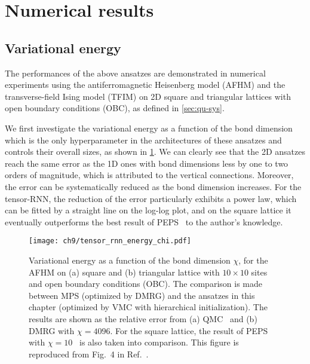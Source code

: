 \section{Numerical results}

\subsection{Variational energy}

The performances of the above ansatzes are demonstrated in numerical experiments using the antiferromagnetic Heisenberg model (AFHM) and the transverse-field Ising model (TFIM) on 2D square and triangular lattices with open boundary conditions (OBC), as defined in \cref{sec:qu-sys}.

We first investigate the variational energy as a function of the bond dimension which is the only hyperparameter in the architectures of these ansatzes and controls their overall sizes, as shown in \cref{fig:tensor-rnn-energy-chi}. We can clearly see that the 2D ansatzes reach the same error as the 1D ones with bond dimensions less by one to two orders of magnitude, which is attributed to the vertical connections. Moreover, the error can be systematically reduced as the bond dimension increases. For the tensor-RNN, the reduction of the error particularly exhibits a power law, which can be fitted by a straight line on the log-log plot, and on the square lattice it eventually outperforms the best result of PEPS~\cite{liu2017gradient} to the author's knowledge.

\begin{figure}[htb]
\centering
\hspace*{-0.05\linewidth}
\texttt{[image: ch9/tensor\_rnn\_energy\_chi.pdf]}
\caption[Variational energy vs. bond dimension for tensor-RNN]{
Variational energy as a function of the bond dimension $\chi$, for the AFHM on (a) square and (b) triangular lattice with $10 \times 10$ sites and open boundary conditions (OBC). The comparison is made between MPS (optimized by DMRG) and the ansatzes in this chapter (optimized by VMC with hierarchical initialization). The results are shown as the relative error from (a) QMC~\cite{sandvik1997finite} and (b) DMRG with $\chi = 4096$. For the square lattice, the result of PEPS with $\chi = 10$~\cite{liu2017gradient} is also taken into comparison.
This figure is reproduced from Fig.~4 in Ref.~\cite{wu2023tensor}.
}
\label{fig:tensor-rnn-energy-chi}
\end{figure}

